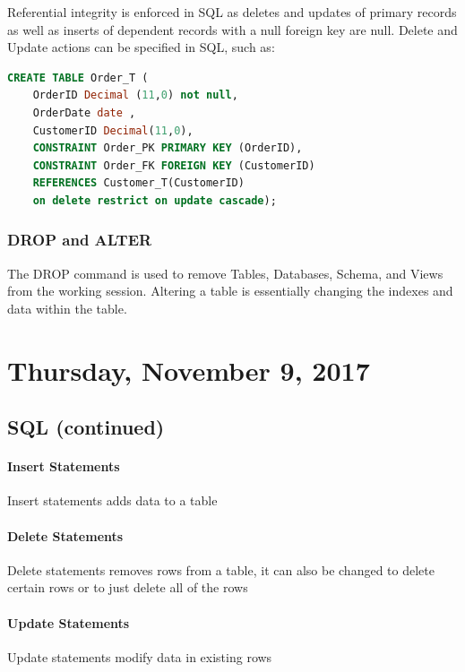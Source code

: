 \documentclass[12pt]{article}
\begin{document}
Referential integrity is enforced in SQL as deletes and updates of primary records as well as inserts of dependent records with a null foreign key are null. Delete and Update actions can be specified in SQL, such as:\\

\begin{lstlisting}[language=SQL]
CREATE TABLE Order_T (
	OrderID Decimal (11,0) not null,
	OrderDate date ,
	CustomerID Decimal(11,0),
	CONSTRAINT Order_PK PRIMARY KEY (OrderID), 
	CONSTRAINT Order_FK FOREIGN KEY (CustomerID)
	REFERENCES Customer_T(CustomerID)
	on delete restrict on update cascade);
\end{lstlisting}

\subsubsection{DROP and ALTER}

The DROP command is used to remove Tables, Databases, Schema, and Views from the working session. Altering a table is essentially changing the indexes and data within the table.

\newpage

\section{Thursday, November 9, 2017}

\subsection{SQL (continued)}

\paragraph{Insert Statements} Insert statements adds data to a table

\paragraph{Delete Statements} Delete statements removes rows from a table, it can also be changed to delete certain rows or to just delete all of the rows

\paragraph{Update Statements} Update statements modify data in existing rows
\end{document}

